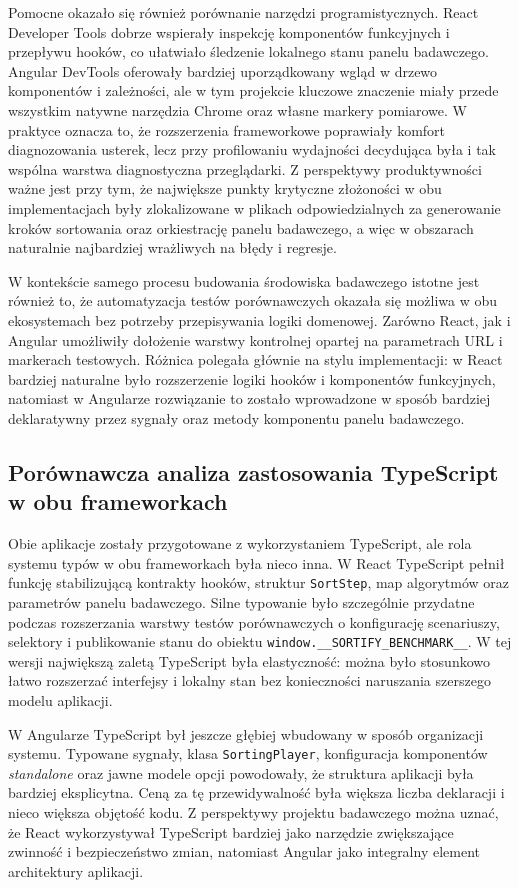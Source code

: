 \documentclass[12pt,openright,twoside]{report}
\begin{document}
Pomocne okazało się również porównanie narzędzi programistycznych. React Developer Tools dobrze wspierały inspekcję komponentów funkcyjnych i przepływu hooków, co ułatwiało śledzenie lokalnego stanu panelu badawczego. Angular DevTools oferowały bardziej uporządkowany wgląd w drzewo komponentów i zależności, ale w tym projekcie kluczowe znaczenie miały przede wszystkim natywne narzędzia Chrome oraz własne markery pomiarowe. W praktyce oznacza to, że rozszerzenia frameworkowe poprawiały komfort diagnozowania usterek, lecz przy profilowaniu wydajności decydująca była i tak wspólna warstwa diagnostyczna przeglądarki. Z perspektywy produktywności ważne jest przy tym, że największe punkty krytyczne złożoności w obu implementacjach były zlokalizowane w plikach odpowiedzialnych za generowanie kroków sortowania oraz orkiestrację panelu badawczego, a więc w obszarach naturalnie najbardziej wrażliwych na błędy i regresje.

W kontekście samego procesu budowania środowiska badawczego istotne jest również to, że automatyzacja testów porównawczych okazała się możliwa w obu ekosystemach bez potrzeby przepisywania logiki domenowej. Zarówno React, jak i Angular umożliwiły dołożenie warstwy kontrolnej opartej na parametrach URL i markerach testowych. Różnica polegała głównie na stylu implementacji: w React bardziej naturalne było rozszerzenie logiki hooków i komponentów funkcyjnych, natomiast w Angularze rozwiązanie to zostało wprowadzone w sposób bardziej deklaratywny przez sygnały oraz metody komponentu panelu badawczego.

\subsection{Porównawcza analiza zastosowania TypeScript w obu frameworkach}
Obie aplikacje zostały przygotowane z wykorzystaniem TypeScript, ale rola systemu typów w obu frameworkach była nieco inna. W React TypeScript pełnił funkcję stabilizującą kontrakty hooków, struktur \texttt{SortStep}, map algorytmów oraz parametrów panelu badawczego. Silne typowanie było szczególnie przydatne podczas rozszerzania warstwy testów porównawczych o konfigurację scenariuszy, selektory i publikowanie stanu do obiektu \texttt{window.\_\_SORTIFY\_BENCHMARK\_\_}. W tej wersji największą zaletą TypeScript była elastyczność: można było stosunkowo łatwo rozszerzać interfejsy i lokalny stan bez konieczności naruszania szerszego modelu aplikacji.

W Angularze TypeScript był jeszcze głębiej wbudowany w sposób organizacji systemu. Typowane sygnały, klasa \texttt{SortingPlayer}, konfiguracja komponentów \textit{standalone} oraz jawne modele opcji powodowały, że struktura aplikacji była bardziej eksplicytna. Ceną za tę przewidywalność była większa liczba deklaracji i nieco większa objętość kodu. Z perspektywy projektu badawczego można uznać, że React wykorzystywał TypeScript bardziej jako narzędzie zwiększające zwinność i bezpieczeństwo zmian, natomiast Angular jako integralny element architektury aplikacji.
\end{document}
